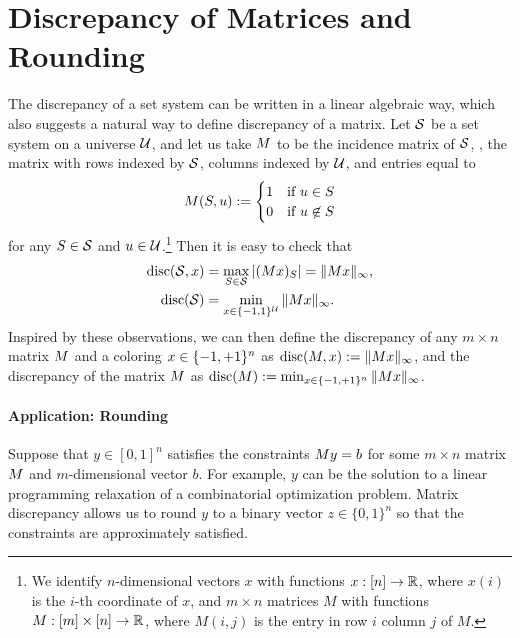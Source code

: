 \section{Discrepancy of Matrices and Rounding}

The discrepancy of a set system can be written in a linear algebraic way, which also suggests a natural way to define discrepancy of a matrix. Let $\mathcal{S}$ be a set system on a universe $\mathcal{U}$, and let us take
$M$ to be the incidence matrix of $\mathcal{S}$,
\ie, the matrix with rows indexed by $\mathcal{S}$, columns indexed by $\mathcal{U}$, and entries equal to 
\[
  M(S,u) :=
  \begin{cases}
    1 & \text{if } u \in S\\
    0 &  \text{if } u \not \in S
  \end{cases}
\]
for any $S \in \mathcal{S}$ and $u \in \mathcal{U}$.\footnote{We identify $n$-dimensional vectors $x$ with functions $x:[n] \to \mathbb{R}$, where $x(i)$ is the $i$-th coordinate of $x$, and $m\times n$ matrices $M$ with functions $M:[m]\times [n] \to \mathbb{R}$, where $M(i,j)$ is the entry in row $i$ column $j$ of $M$.} Then it is easy to check that 
\begin{align*}
\operatorname{disc}(\mathcal{S},x) &= \max_{S \in \mathcal{S}} |(Mx)_S| = \|M x\|_{\infty},\\
\operatorname{disc}(\mathcal{S}) &= \min_{x \in \{-1,1\}^{\mathcal{U}}} \|Mx\|_\infty.
\end{align*}
Inspired by these observations, we can then define the discrepancy of any $m\times n$ matrix $M$ and a coloring $x \in \{-1,+1\}^n$ as $\operatorname{disc}(M,x) := \|Mx\|_\infty$, and the discrepancy of the matrix $M$ as $\operatorname{disc}(M) := \min_{x \in \{-1,+1\}^n} \|Mx\|_\infty$.

\paragraph{Application: Rounding}
Suppose that $y \in [0,1]^n$ satisfies the constraints $M y = b$ for some $m\times n$ matrix $M$ and $m$-dimensional vector $b$. For example, $y$ can be the solution to a linear programming relaxation of a combinatorial optimization problem. Matrix discrepancy allows us to round $y$ to a binary vector $z \in \{0,1\}^n$ so that the constraints are approximately satisfied. 

